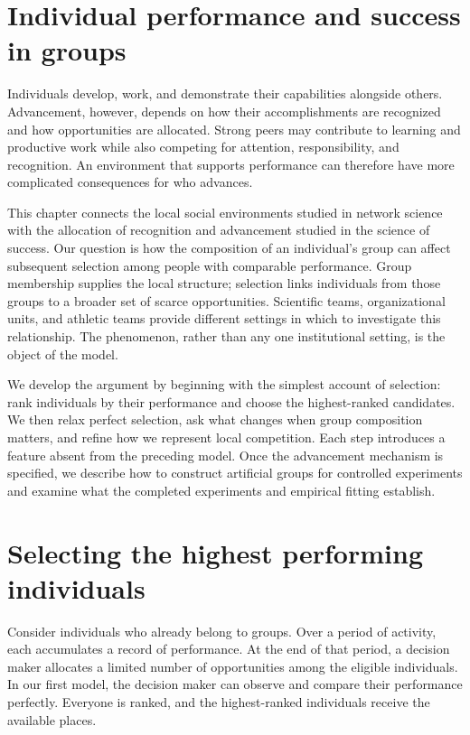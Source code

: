 \section{Individual performance and success in groups}\label{individual-performance-and-success-in-groups}

Individuals develop, work, and demonstrate their capabilities alongside others. Advancement, however, depends on how their accomplishments are recognized and how opportunities are allocated. Strong peers may contribute to learning and productive work while also competing for attention, responsibility, and recognition. An environment that supports performance can therefore have more complicated consequences for who advances.

This chapter connects the local social environments studied in network science with the allocation of recognition and advancement studied in the science of success. Our question is how the composition of an individual's group can affect subsequent selection among people with comparable performance. Group membership supplies the local structure; selection links individuals from those groups to a broader set of scarce opportunities. Scientific teams, organizational units, and athletic teams provide different settings in which to investigate this relationship. The phenomenon, rather than any one institutional setting, is the object of the model.

We develop the argument by beginning with the simplest account of selection: rank individuals by their performance and choose the highest-ranked candidates. We then relax perfect selection, ask what changes when group composition matters, and refine how we represent local competition. Each step introduces a feature absent from the preceding model. Once the advancement mechanism is specified, we describe how to construct artificial groups for controlled experiments and examine what the completed experiments and empirical fitting establish.

\section{Selecting the highest performing individuals}\label{selecting-the-highest-performing-individuals}

Consider individuals who already belong to groups. Over a period of activity, each accumulates a record of performance. At the end of that period, a decision maker allocates a limited number of opportunities among the eligible individuals. In our first model, the decision maker can observe and compare their performance perfectly. Everyone is ranked, and the highest-ranked individuals receive the available places.

